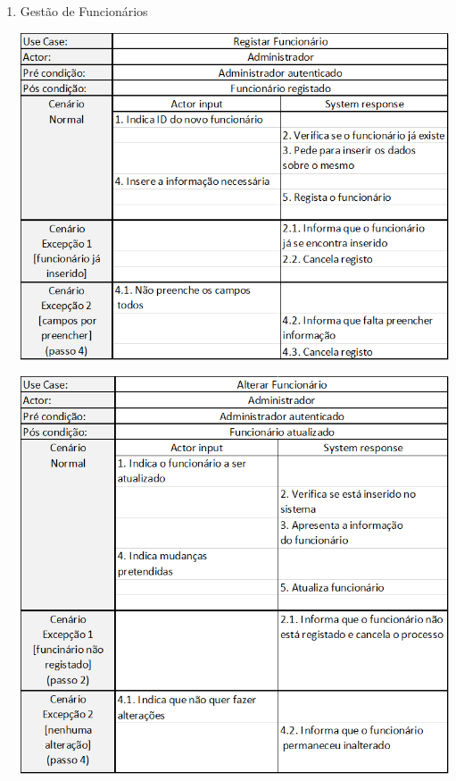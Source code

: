 \documentclass[11pt]{article} %
\begin{document}
\begin{enumerate}
\begin{center}
	\end{center}
	\newpage
	\item Gestão de Funcionários
	\begin{center}
		\includegraphics[width = 5in]{gfunc_registar.png} 
	\end{center}
	\begin{center}
 		\includegraphics[width = 5in]{gfunc_alterar.png} 
	\end{center}
	\begin{center}

\end{center}
\end{enumerate}
\end{document}
